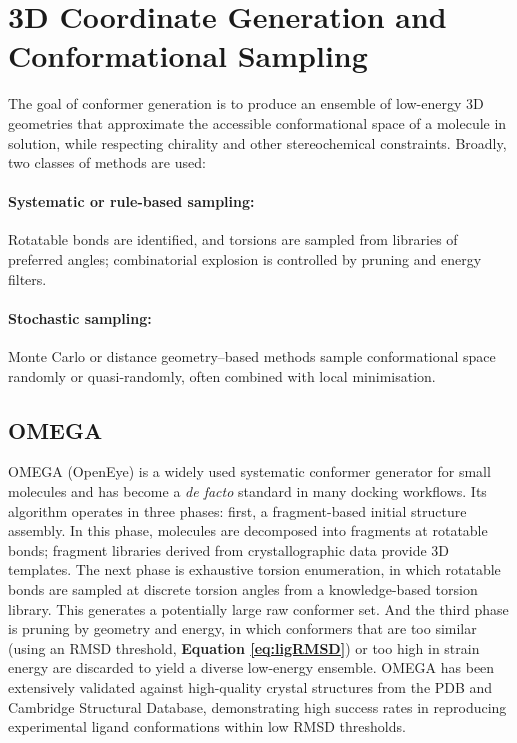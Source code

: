 \documentclass[12pt]{article}
\begin{document}
\section{3D Coordinate Generation and Conformational Sampling}
The goal of conformer generation is to produce an ensemble of low-energy 3D geometries that approximate the accessible conformational space of a molecule in solution, while respecting chirality and other stereochemical constraints. Broadly, two classes of methods are used: 

  \paragraph{Systematic or rule-based sampling:} Rotatable bonds are identified, and torsions are sampled from libraries of preferred angles; combinatorial explosion is controlled by pruning and energy filters.
  \paragraph{Stochastic sampling:} Monte Carlo or distance geometry–based methods sample conformational space randomly or quasi-randomly, often combined with local minimisation.

\subsection{OMEGA}

OMEGA (OpenEye)\cite{CH6_Hawkins2010} is a widely used systematic conformer generator for small molecules and has become a \emph{de facto} standard in many docking workflows. Its algorithm operates in three phases: first, a fragment-based initial structure assembly. In this phase, molecules are decomposed into fragments at rotatable bonds; fragment libraries derived from crystallographic data provide 3D templates. The next phase is exhaustive torsion enumeration, in which rotatable bonds are sampled at discrete torsion angles from a knowledge-based torsion library. This generates a potentially large raw conformer set. And the third phase is pruning by geometry and energy, in which conformers that are too similar (using an RMSD threshold, \textbf{Equation \ref{eq:ligRMSD}}) or too high in strain energy are discarded to yield a diverse low-energy ensemble. OMEGA\cite{CH6_Hawkins2010} has been extensively validated against high-quality crystal structures from the PDB and Cambridge Structural Database\cite{CH6_groom2016cambridge}, demonstrating high success rates in reproducing experimental ligand conformations within low RMSD thresholds.
\end{document}
